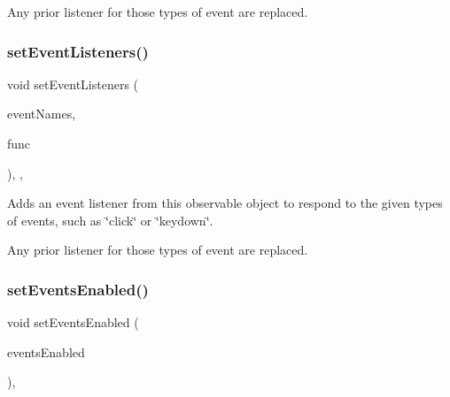 Any prior listener for those types of event are replaced. \mbox{\label{classsgl_1_1GObservable_a7867184bbb686f74fae8a4db927da799}} 
\subsubsection{\texorpdfstring{set\+Event\+Listeners()}{setEventListeners()}\hspace{0.1cm}{\footnotesize\ttfamily [2/2]}}
{\footnotesize\ttfamily void set\+Event\+Listeners (\begin{DoxyParamCaption}\item[{std\+::initializer\+\_\+list$<$ std\+::string $>$}]{event\+Names,  }\item[{\mbox{\hyperlink{namespacesgl_a54427ce97bb1c2804e4fe2b0a62e8b17}{G\+Event\+Listener\+Void}}}]{func }\end{DoxyParamCaption})\hspace{0.3cm}{\ttfamily [protected]}, {\ttfamily [virtual]}, {\ttfamily [inherited]}}



Adds an event listener from this observable object to respond to the given types of events, such as \char`\"{}click\char`\"{} or \char`\"{}keydown\char`\"{}. 

Any prior listener for those types of event are replaced. \mbox{\label{classsgl_1_1GObservable_afaa30b2a9e0f378fd1c70d2f1d0b8216}} 
\subsubsection{\texorpdfstring{set\+Events\+Enabled()}{setEventsEnabled()}}
{\footnotesize\ttfamily void set\+Events\+Enabled (\begin{DoxyParamCaption}\item[{bool}]{events\+Enabled }\end{DoxyParamCaption})\hspace{0.3cm}{\ttfamily [virtual]}, {\ttfamily [inherited]}}



